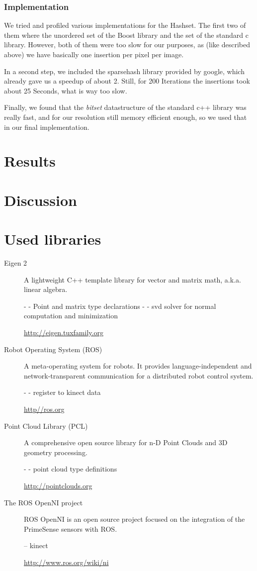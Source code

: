 \documentclass[10pt,twocolumn,letterpaper]{article}
\begin{document}
\subsubsection{Implementation}
We tried and profiled various implementations for the Hashset. The first two of them where the unordered set of the Boost library and the set of the
standard c library. However, both of them were too slow for our purposes, as (like described above) we have basically one insertion per pixel per image.

In a second step, we included the sparsehash library provided by google, which already gave us a speedup of about 2. Still, for 200 Iterations the
insertions took about 25 Seconds, what is way too slow.

Finally, we found that the \textit{bitset} datastructure of the standard c++ library was really fast, and for our resolution still memory efficient enough,
so we used that in our final implementation.

\section{Results}

\section{Discussion}

\section{Used libraries}
\begin{description}
\item[Eigen 2]
A lightweight C++ template library for vector and matrix math,
a.k.a. linear algebra.

- - Point and matrix type declarations
- - svd solver for normal computation and minimization

\href{http://eigen.tuxfamily.org}{http://eigen.tuxfamily.org}

\item[Robot Operating System (ROS)]
A meta-operating system for robots. It provides
language-independent and network-transparent communication for a
distributed robot control system.

- - register to kinect data

\href{http://ros.org}{http//ros.org}

\item[Point Cloud Library (PCL)]
A comprehensive open source library for n-D Point Clouds and 3D geometry processing.

- - point cloud type definitions

\href{http://pointclouds.org}{http://pointclouds.org}

\item[The ROS OpenNI project]
ROS OpenNI is an open source project focused on the integration of the PrimeSense sensors with ROS.

-- kinect

\href{http://www.ros.org/wiki/ni}{http://www.ros.org/wiki/ni}

\end{description}
\end{document}
